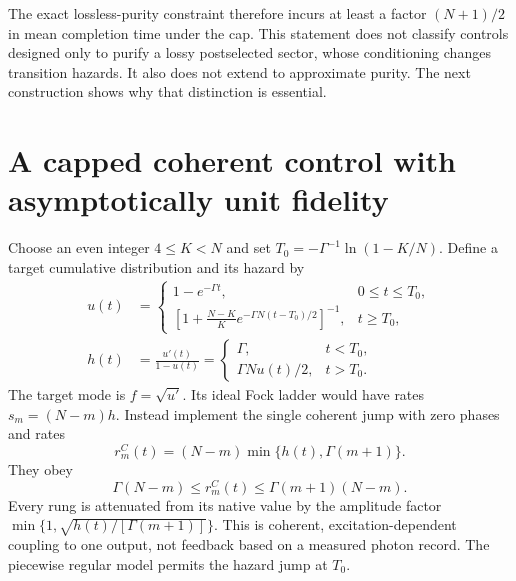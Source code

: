 \documentclass[11pt,a4paper]{article}
\begin{document}
The exact lossless-purity constraint therefore incurs at least
a factor \((N+1)/2\) in mean completion time under the cap.
This statement does not classify controls designed only to purify
a lossy postselected sector, whose conditioning changes transition
hazards. It also does not extend to approximate purity. The next
construction shows why that distinction is essential.

\section{A capped coherent control with asymptotically unit fidelity}
\label{sec:capped}

Choose an even integer \(4\le K<N\) and set
\(T_0=-\Gamma^{-1}\ln(1-K/N)\). Define a target cumulative
distribution and its hazard by
\begin{align}
 u(t)&=
 \begin{cases}
  1-e^{-\Gamma t},&0\le t\le T_0,\\[2pt]
  \displaystyle\left[1+\frac{N-K}{K}
  e^{-\Gamma N(t-T_0)/2}\right]^{-1},&t\ge T_0,
 \end{cases} \label{eq:cappedcdf}\\
 h(t)&=\frac{u'(t)}{1-u(t)}
 =\begin{cases}\Gamma,&t<T_0,\\
 \Gamma Nu(t)/2,&t>T_0.
 \end{cases} \label{eq:cappedhazard}
\end{align}
The target mode is \(f=\sqrt{u'}\). Its ideal Fock ladder would
have rates \(s_m=(N-m)h\). Instead implement the single coherent
jump with zero phases and rates
\begin{equation}
 r_m^C(t)=(N-m)\min\{h(t),\Gamma(m+1)\}.
 \label{eq:cappedrates}
\end{equation}
They obey
\begin{equation}
 \Gamma(N-m)\le r_m^C(t)\le\Gamma(m+1)(N-m).
 \label{eq:cappedbounds}
\end{equation}
Every rung is attenuated from its native value by the amplitude
factor \(\min\{1,\sqrt{h(t)/[\Gamma(m+1)]}\}\). This is coherent,
excitation-dependent coupling to one output, not feedback based
on a measured photon record. The piecewise regular model permits
the hazard jump at \(T_0\).
\end{document}
